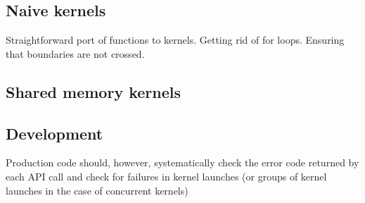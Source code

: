 \subsection{Naive kernels}
Straightforward port of functions to kernels. Getting rid of for loops. Ensuring that boundaries are not crossed.


\subsection{Shared memory kernels}

\subsection{Development}
Production code should, however, systematically check the error code returned by each API call and check for failures in kernel launches (or groups of kernel launches in the case of concurrent kernels) 